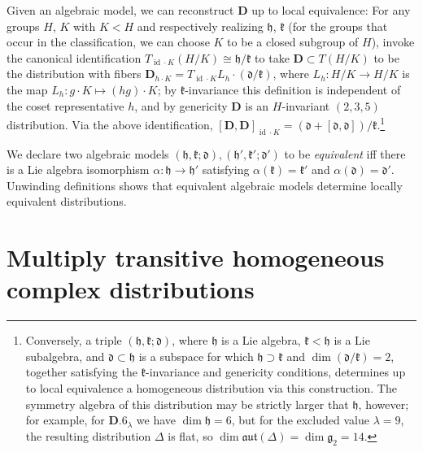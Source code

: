 \documentclass[pdftex]{sigma}
\DeclareMathOperator{\id} {id}
\newcommand{\mbD}{\mathbf{D}}
\newcommand{\mfd} {\mathfrak{d}}
\newcommand{\mfg} {\mathfrak{g}}
\newcommand{\mfh} {\mathfrak{h}}
\newcommand{\mfk} {\mathfrak{k}}
\newcommand{\mfaut}{\mathfrak{aut}}
\numberwithin{equation}{section}
\begin{document}
Given an algebraic model, we can reconstruct $\mbD$ up to local equivalence: For any groups $H$, $K$ with $K < H$ and respectively realizing $\mfh$, $\mfk$ (for the groups that occur in the classification, we can choose $K$ to be a closed subgroup of $H$), invoke the canonical identification $T_{\id \cdot K} (H / K) \cong \mfh / \mfk$ to take $\mbD \subset T(H / K)$ to be the distribution with fibers $\mbD_{h \cdot K} = T_{\id \cdot K} L_h \cdot (\mfd / \mfk)$, where $L_h \colon H / K \to H / K$ is the map $L_h \colon g \cdot K \mapsto (hg) \cdot K$; by $\mfk$-invariance this definition is independent of the coset representative $h$, and by genericity $\mbD$ is an $H$-invariant $(2, 3, 5)$ distribution. Via the above identification, $[\mbD, \mbD]_{\id \cdot K} = (\mfd + [\mfd, \mfd]) / \mfk$.\footnote{Conversely, a triple $(\mfh, \mfk; \mfd)$, where $\mfh$ is a Lie algebra, $\mfk < \mfh$ is a Lie subalgebra, and $\mfd \subset \mfh$ is a subspace for which $\mfh \supset \mfk$ and $\dim (\mfd / \mfk) = 2$, together satisfying the $\mfk$-invariance and genericity conditions, determines up to local equivalence a homogeneous distribution via this construction. The symmetry algebra of this distribution may be strictly larger that $\mfh$, however; for example, for $\mathbf{D.6}_{\lambda}$ we have $\dim \mfh = 6$, but for the excluded value $\lambda = 9$, the resulting distribution $\Delta$ is flat, so $\dim \mfaut(\Delta) = \dim \mfg_2 = 14$.}

We declare two algebraic models $(\mfh, \mfk; \mfd), (\mfh', \mfk'; \mfd')$ to be \textit{equivalent} iff there is a Lie algebra isomorphism $\alpha\colon \mfh \to \mfh'$ satisfying $\alpha(\mfk) = \mfk'$ and $\alpha(\mfd) = \mfd'$. Unwinding definitions shows that equivalent algebraic models determine locally equivalent distributions.

\section{Multiply transitive homogeneous complex distributions}\label{section:classification-complex}
\end{document}
